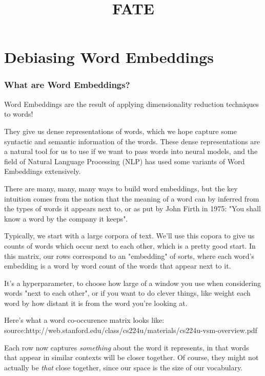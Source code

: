 \documentclass[11pt]{article}
\title{FATE}
\begin{document}
    
    
    \maketitle
    
    

    
    \section{Debiasing Word Embeddings}\label{debiasing-word-embeddings}

\subsubsection{What are Word
Embeddings?}\label{what-are-word-embeddings}

Word Embeddings are the result of applying dimensionality reduction
techniques to words!

They give us dense representations of words, which we hope capture some
syntactic and semantic information of the words. These dense
representations are a natural tool for us to use if we want to pass
words into neural models, and the field of Natural Language Processing
(NLP) has used some variants of Word Embeddings extensively.

There are many, many, many ways to build word embeddings, but the key
intuition comes from the notion that the meaning of a word can by
inferred from the types of words it appears next to, or as put by John
Firth in 1975: "You shall know a word by the company it keeps".

Typically, we start with a large corpora of text. We'll use this copora
to give us counts of words which occur next to each other, which is a
pretty good start. In this matrix, our rows correspond to an "embedding"
of sorts, where each word's embedding is a word by word count of the
words that appear next to it.

It's a hyperparameter, to choose how large of a window you use when
considering words "next to each other", or if you want to do clever
things, like weight each word by how distant it is from the word you're
looking at.

Here's what a word co-occurence matrix looks like:
{source:http://web.stanford.edu/class/cs224u/materials/cs224u-vsm-overview.pdf}

Each row now captures \emph{something} about the word it represents, in
that words that appear in similar contexts will be closer together. Of
course, they might not actually be \emph{that} close together, since our
space is the size of our vocabulary.
\end{document}
